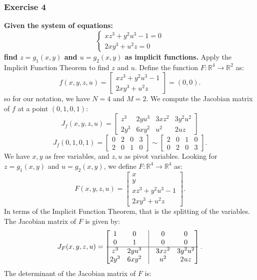 \documentclass[11pt]{article}
\begin{document}
\subsubsection*{Exercise 4}
\textbf{Given the system of equations:}
\[\begin{cases}
xz^3 + y^2u^3 - 1 = 0 \\
2xy^3 + u^2z = 0
\end{cases}\]
\textbf{find \(z = g_1(x, y)\) and \(u = g_2(x, y)\) as implicit functions.}
\vskip 0.5cm
Apply the Implicit Function Theorem to find \(z\) and \(u\). Define the function \(F : \mathbb{R}^4 \to \mathbb{R}^2\) as:
\[f(x, y, z, u) = \begin{bmatrix} xz^3 + y^2u^3 - 1 \\ 2xy^3 + u^2z \end{bmatrix} = (0, 0).\]
so for our notation, we have \(N = 4\) and \(M = 2\). We compute the Jacobian matrix of \(f\) at a point \((0, 1, 0, 1)\):
\[J_f(x, y, z, u) = \begin{bmatrix} z^3 & 2yu^3 & 3xz^2 & 3y^2u^2 \\ 2y^3 & 6xy^2 & u^2 & 2uz \end{bmatrix}\]
\[J_f(0, 1, 0, 1) = \begin{bmatrix} 0 & 2 & 0 & 3 \\ 2 & 0 & 1 & 0 \end{bmatrix} \sim \begin{bmatrix} 2 & 0 & 1 & 0 \\ 0 & 2 & 0 & 3 \end{bmatrix}.\]
We have \(x, y\) as free variables, and \(z, u\) as pivot variables. Looking for \(z = g_1(x, y)\) and \(u = g_2(x, y)\), we define \(F : \mathbb{R}^4 \to \mathbb{R}^4\) as:
\[F(x, y, z, u) = \begin{bmatrix} x \\ y \\ xz^3 + y^2u^3 - 1 \\ 2xy^3 + u^2z \end{bmatrix}.\]
In terms of the Implicit Function Theorem, that is the splitting of the variables. The Jacobian matrix of \(F\) is given by:
\[J_F(x, y, z, u) = \begin{bmatrix}1 & 0 & \vline & 0 & 0 \\ 0 & 1 & \vline & 0 & 0 \\ \hline z^3 & 2yu^3 & \vline & 3xz^2 & 3y^2u^2 \\ 2y^3 & 6xy^2 & \vline & u^2 & 2uz \end{bmatrix}.\]
The determinant of the Jacobian matrix of \(F\) is:
\end{document}
